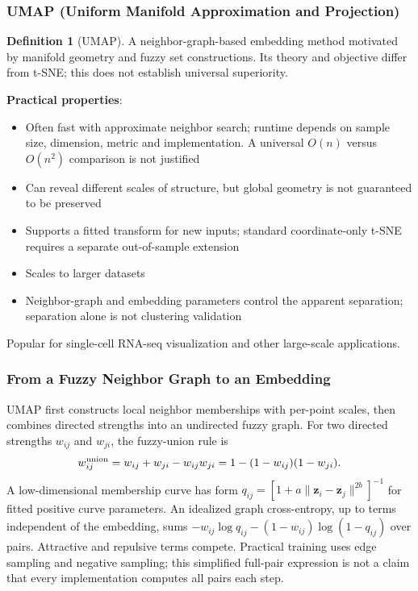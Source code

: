 \documentclass[11pt,twoside]{article}
\numberwithin{equation}{section}
\newcommand{\vect}[1]{\bm{#1}}
\theoremstyle{plain}
\theoremstyle{definition}
\newtheorem{definition}[theorem]{Definition}
\theoremstyle{remark}
\begin{document}
\subsubsection{UMAP (Uniform Manifold Approximation and Projection)}

\begin{definition}[UMAP]
A neighbor-graph-based embedding method motivated by manifold geometry and fuzzy set constructions. Its theory and objective differ from t-SNE; this does not establish universal superiority.

\textbf{Practical properties}:
\begin{itemize}
\item Often fast with approximate neighbor search; runtime depends on sample size, dimension, metric and implementation. A universal $O(n)$ versus $O(n^2)$ comparison is not justified
\item Can reveal different scales of structure, but global geometry is not guaranteed to be preserved
\item Supports a fitted transform for new inputs; standard coordinate-only t-SNE requires a separate out-of-sample extension
\item Scales to larger datasets
\item Neighbor-graph and embedding parameters control the apparent separation; separation alone is not clustering validation
\end{itemize}

Popular for single-cell RNA-seq visualization and other large-scale applications.
\end{definition}

\subsubsection{From a Fuzzy Neighbor Graph to an Embedding}
UMAP first constructs local neighbor memberships with per-point scales, then combines directed strengths into an undirected fuzzy graph. For two directed strengths $w_{ij}$ and $w_{ji}$, the fuzzy-union rule is
\[
w_{ij}^{\rm union}=w_{ij}+w_{ji}-w_{ij}w_{ji}=1-(1-w_{ij})(1-w_{ji}).
\]
A low-dimensional membership curve has form $q_{ij}=[1+a\|\vect z_i-\vect z_j\|^{2b}]^{-1}$ for fitted positive curve parameters. An idealized graph cross-entropy, up to terms independent of the embedding, sums
$-w_{ij}\log q_{ij}-(1-w_{ij})\log(1-q_{ij})$ over pairs. Attractive and repulsive terms compete. Practical training uses edge sampling and negative sampling; this simplified full-pair expression is not a claim that every implementation computes all pairs each step.
\end{document}
